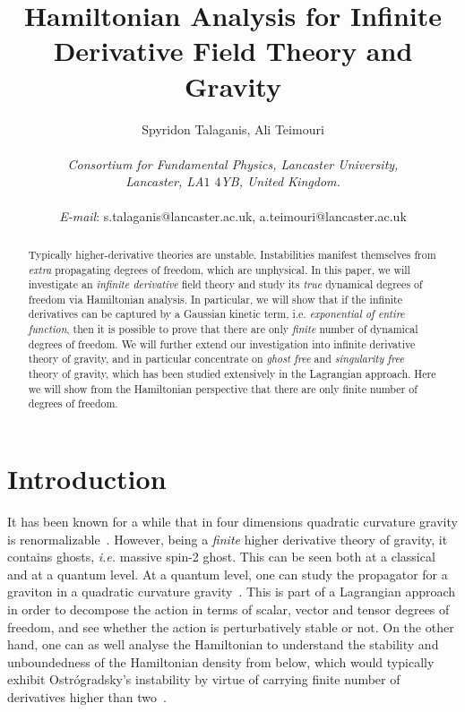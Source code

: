 \documentclass[a4paper,12pt]{article}
\newcommand{\+}{^{\dagger}}
\newcommand{\2}{\frac{1}{2}}
\newcommand{\3}{\frac{1}{3}}
\newcommand{\4}{\frac{1}{4}}
\newcommand{\6}{\frac{1}{6}}
\newcommand{\8}{\frac{1}{8}}
\begin{document}
\title{Hamiltonian Analysis for Infinite Derivative Field Theory and Gravity}
\author{Spyridon Talaganis, Ali Teimouri \\ \\
 {\it Consortium for Fundamental Physics, Lancaster University,} \\
{\it Lancaster, LA$1$ $4$YB, United Kingdom.}\\
\begin{footnotesize}\textit{E-mail}:  s.talaganis@lancaster.ac.uk, a.teimouri@lancaster.ac.uk\end{footnotesize}}
\date{}


\maketitle

\begin{abstract}
Typically higher-derivative theories are unstable. Instabilities manifest themselves from {\it extra} propagating degrees of freedom, which are unphysical. In this paper, we will investigate an {\it infinite derivative} field theory and study its {\it true} dynamical degrees of freedom via Hamiltonian analysis.
In particular, we will show that if the infinite derivatives can be captured by a Gaussian kinetic term, i.e. {\it exponential of entire function}, then it is possible to prove that there are only {\it finite} number of dynamical degrees of freedom. We will further extend our investigation into infinite derivative theory of gravity, and in particular concentrate on {\it ghost free} and {\it singularity free} theory of gravity, which has been studied extensively in the Lagrangian approach. Here we will show from the Hamiltonian perspective that there are only finite number of degrees of freedom. \end{abstract}

\tableofcontents

\section{Introduction}


It has been known for a while that in four dimensions quadratic curvature gravity is renormalizable~\cite{Stelle:1976gc}. However, being a {\it finite} higher derivative theory of gravity, it contains ghosts, \textit{i.e.} massive spin-2 ghost. This can be seen 
both at a classical and at a quantum level. At a quantum level, one can study the propagator for a graviton in 
a quadratic curvature gravity~\cite{Rivers,VanNieuwenhuizen:1973fi}. This is part of a Lagrangian approach in order to decompose the action in terms of scalar, vector and tensor degrees of freedom, and see whether the action is perturbatively
stable or not. On the other hand, one can as well analyse the Hamiltonian to understand the stability and unboundedness of the 
Hamiltonian density from below, which would typically exhibit Ostr\'ogradsky's instability by virtue of carrying finite number of derivatives higher than two~\cite{Label1}.
\end{document}
